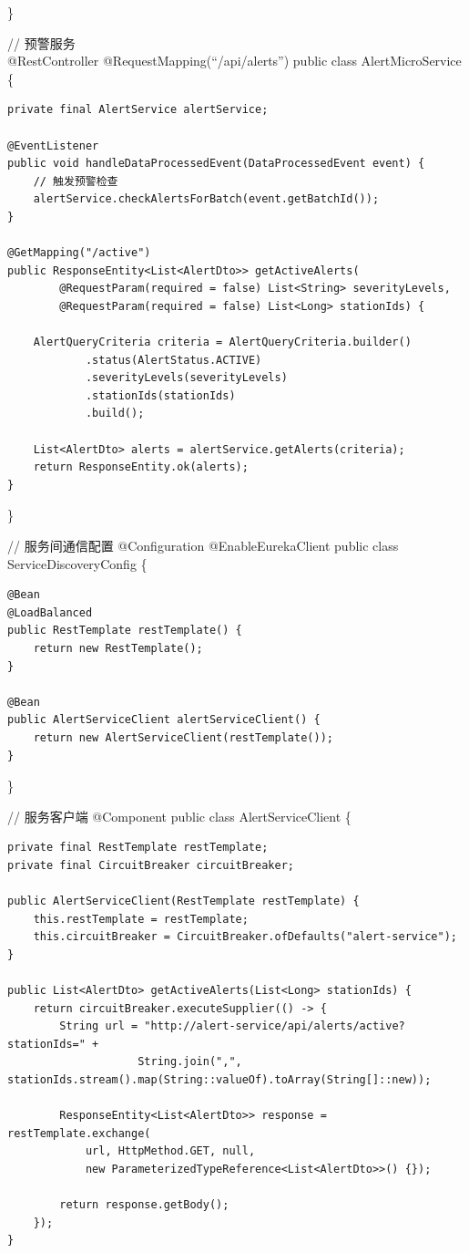 \}

// 预警服务\\
@RestController @RequestMapping(``/api/alerts'') public class AlertMicroService \{

\begin{verbatim}
private final AlertService alertService;

@EventListener
public void handleDataProcessedEvent(DataProcessedEvent event) {
    // 触发预警检查
    alertService.checkAlertsForBatch(event.getBatchId());
}

@GetMapping("/active")
public ResponseEntity<List<AlertDto>> getActiveAlerts(
        @RequestParam(required = false) List<String> severityLevels,
        @RequestParam(required = false) List<Long> stationIds) {
    
    AlertQueryCriteria criteria = AlertQueryCriteria.builder()
            .status(AlertStatus.ACTIVE)
            .severityLevels(severityLevels)
            .stationIds(stationIds)
            .build();
            
    List<AlertDto> alerts = alertService.getAlerts(criteria);
    return ResponseEntity.ok(alerts);
}
\end{verbatim}

\}

// 服务间通信配置 @Configuration @EnableEurekaClient public class ServiceDiscoveryConfig \{

\begin{verbatim}
@Bean
@LoadBalanced
public RestTemplate restTemplate() {
    return new RestTemplate();
}

@Bean
public AlertServiceClient alertServiceClient() {
    return new AlertServiceClient(restTemplate());
}
\end{verbatim}

\}

// 服务客户端 @Component public class AlertServiceClient \{

\begin{verbatim}
private final RestTemplate restTemplate;
private final CircuitBreaker circuitBreaker;

public AlertServiceClient(RestTemplate restTemplate) {
    this.restTemplate = restTemplate;
    this.circuitBreaker = CircuitBreaker.ofDefaults("alert-service");
}

public List<AlertDto> getActiveAlerts(List<Long> stationIds) {
    return circuitBreaker.executeSupplier(() -> {
        String url = "http://alert-service/api/alerts/active?stationIds=" + 
                    String.join(",", stationIds.stream().map(String::valueOf).toArray(String[]::new));
                    
        ResponseEntity<List<AlertDto>> response = restTemplate.exchange(
            url, HttpMethod.GET, null, 
            new ParameterizedTypeReference<List<AlertDto>>() {});
            
        return response.getBody();
    });
}
\end{verbatim}

